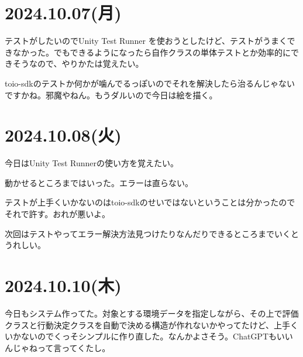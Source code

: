 \documentclass[fleqn,twocolumn]{mynote}
\begin{document}
\section*{2024.10.07(月)}
テストがしたいのでUnity Test Runner を使おうとしたけど、テストがうまくできなかった。でもできるようになったら自作クラスの単体テストとか効率的にできそうなので、やりかたは覚えたい。

toio-sdkのテストか何かが噛んでるっぽいのでそれを解決したら治るんじゃないですかね。邪魔やねん。もうダルいので今日は絵を描く。

\section*{2024.10.08(火)}
今日はUnity Test Runnerの使い方を覚えたい。

動かせるところまではいった。エラーは直らない。

テストが上手くいかないのはtoio-sdkのせいではないということは分かったのでそれで許す。おれが悪いよ。

次回はテストやってエラー解決方法見つけたりなんだりできるところまでいくとうれしい。

\section*{2024.10.10(木)}
今日もシステム作ってた。対象とする環境データを指定しながら、その上で評価クラスと行動決定クラスを自動で決める構造が作れないかやってたけど、上手くいかないのでくっそシンプルに作り直した。なんかよさそう。ChatGPTもいいんじゃねって言ってくたし。

\fboxsep=0pt            %
\fboxrule=1pt            %
\begin{figure}[h]
  \centering
  \caption{}
  \label{fig:}
\end{figure}
\end{document}
